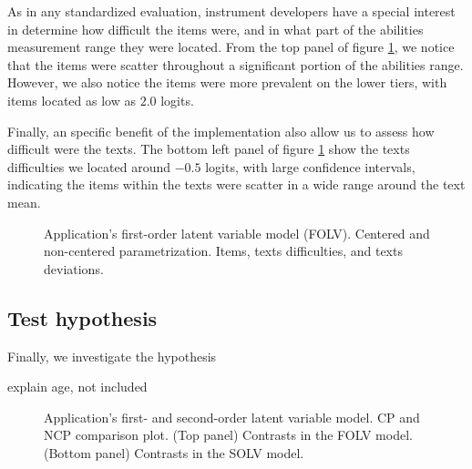 As in any standardized evaluation, instrument developers have a special interest in determine how difficult the items were, and in what part of the abilities measurement range they were located. From the top panel of figure \ref{fig:FOLV_CE.NC_recovery}, we notice that the items were scatter throughout a significant portion of the abilities range. However, we also notice the items were more prevalent on the lower tiers, with items located as low as $2.0$ logits.

Finally, an specific benefit of the implementation also allow us to assess how difficult were the texts. The bottom left panel of figure \ref{fig:FOLV_CE.NC_recovery} show the texts difficulties we located around $-0.5$ logits, with large confidence intervals, indicating the items within the texts were scatter in a wide range around the text mean.
%
\begin{figure}[H]
	\centering
	\begin{subfigure}
		\texttt{[image: FOLV\_recovery\_items]}
	\end{subfigure}
	\begin{subfigure}
		\texttt{[image: FOLV\_recovery\_texts]}
	\end{subfigure}
	\caption[Application's first-order latent variable model (FOLV). Centered and non-centered parametrization. Items, and texts difficulties, and texts deviations.]%
	{Application's first-order latent variable model (FOLV). Centered and non-centered parametrization. Items, texts difficulties, and texts deviations.}
	\label{fig:FOLV_CE.NC_recovery}
\end{figure}



\subsection{Test hypothesis} \label{sect:test_hypothesis}

Finally, we investigate the hypothesis 

explain age, not included
%
\begin{figure}[H]
	\centering
	\begin{subfigure}
		\texttt{[image: FOLV\_recovery\_contrast]}
	\end{subfigure}
	\begin{subfigure}
		\texttt{[image: SOLV\_recovery\_contrast]}
	\end{subfigure}
%
	\caption[Application's first- and second-order latent variable model. CP and NCP comparison plot.]%
	{Application's first- and second-order latent variable model. CP and NCP comparison plot. (Top panel) Contrasts in the FOLV model. (Bottom panel) Contrasts in the SOLV model. }
	\label{fig:contrast_both}
\end{figure}






